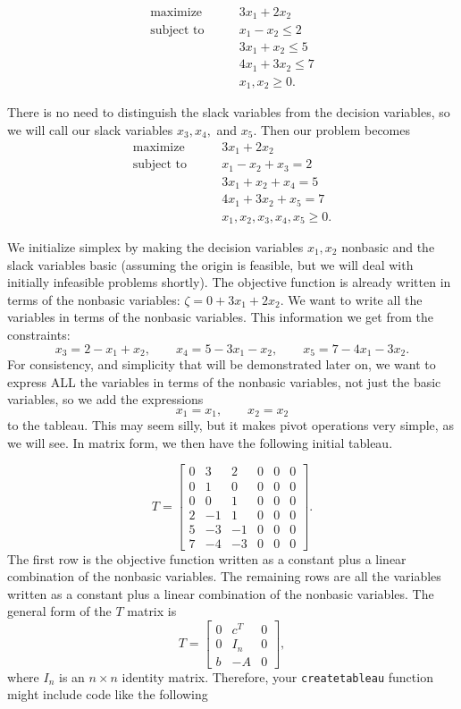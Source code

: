 \begin{align*}
	\mbox{maximize}\qquad
        &    3x_1 + 2x_2 \\
	\mbox{subject to}\qquad
        &     x_1 - x_2 \leq 2 \\
		&	 3x_1 + x_2 \leq 5 \\
		&	 4x_1 + 3x_2 \leq 7 \\
		&     x_1, x_2 \geq 0.
\end{align*}

There is no need to distinguish the slack variables from the decision variables, so we will call our slack variables $x_3, x_4,$ and $x_5$.
Then our problem becomes
\begin{align*}
	\mbox{maximize}\qquad
        &    3x_1 + 2x_2 \\
	\mbox{subject to}\qquad
        &     x_1 - x_2 + x_3 = 2 \\
		&	 3x_1 + x_2 + x_4 = 5 \\
		&	 4x_1 + 3x_2 + x_5 = 7 \\
		&     x_1, x_2, x_3, x_4, x_5 \geq 0.
\end{align*}

We initialize simplex by making the decision variables $x_1, x_2$ nonbasic and the slack variables basic (assuming the origin is feasible, but we will deal with initially infeasible problems shortly).
The objective function is already written in terms of the nonbasic variables: $\zeta = 0 + 3x_1 + 2x_2$.
We want to write all the variables in terms of the nonbasic variables. This information we get from the constraints:
\[ x_3 = 2 - x_1 + x_2, \qquad x_4 = 5 - 3x_1 - x_2, \qquad x_5 = 7 - 4x_1 - 3x_2. \]
For consistency, and simplicity that will be demonstrated later on, we want to express ALL the variables in terms of the nonbasic variables, not just the basic variables, so we add the expressions
\[ x_1 = x_1, \qquad x_2 = x_2 \]
to the tableau.
This may seem silly, but it makes pivot operations very simple, as we will see.
In matrix form, we then have the following initial tableau.

\[
	T = \begin{bmatrix}
		0 & 3 & 2 & 0 & 0 & 0 \\
		0 & 1 & 0 & 0 & 0 & 0 \\
		0 & 0 & 1 & 0 & 0 & 0 \\
		2 &-1 & 1 & 0 & 0 & 0 \\
		5 &-3 &-1 & 0 & 0 & 0 \\
		7 &-4 &-3 & 0 & 0 & 0
	\end{bmatrix}.
\]
The first row is the objective function written as a constant plus a linear combination of the nonbasic variables.
The remaining rows are all the variables written as a constant plus a linear combination of the nonbasic variables.
The general form of the $T$ matrix is
\[ T = \begin{bmatrix}
    0 & c^T   & 0 \\
    0 & I_n & 0 \\
    b & -A  & 0
\end{bmatrix}, \]
where $I_n$ is an $n \times n$ identity matrix.
Therefore, your {\tt createtableau} function might include code like the following

